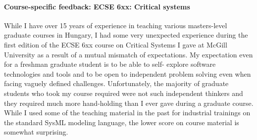 %
%
%


\paragraph{Course-specific feedback: ECSE 6xx: Critical systems}
While I have over 15 years of experience in teaching various masters-level graduate courses in Hungary, I had some very 
unexpected experience during the first edition of the ECSE 6xx course on Critical Systems I gave at McGill University as a 
result of a mutual mismatch of expectations. My expectation even for a freshman graduate student is to be able to self-
explore software technologies and tools and to be open to independent problem solving even when facing vaguely defined 
challenges. Unfortunately, the majority of graduate students who took my course required were not such independent 
thinkers and they required much more hand-holding than I ever gave during a graduate course. While I used some of the 
teaching material in the past for industrial trainings on the standard SysML modeling language, the lower score on 
course material is somewhat surprising.

